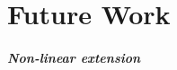 \chapter{Future Work}
\label{chap:future}

\paragraph{Non-linear extension}
\cite{conf/cav/DaiXZ13}
